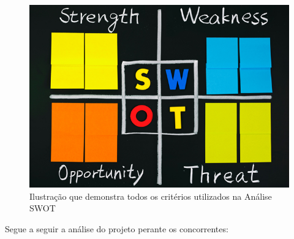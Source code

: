 \documentclass[graduacao,brazil]{ThesisPUC}
\begin{document}
\begin{figure}[H]
    \centering
    \includegraphics[width=\linewidth]{Imagens/swot.jpg}
    \caption{Ilustração que demonstra todos os critérios utilizados na Análise SWOT}
\end{figure}

Segue a seguir a an\'{a}lise do projeto perante os concorrentes:
\end{document}
